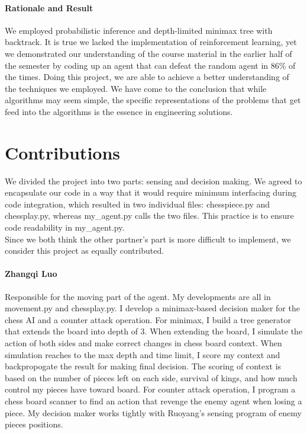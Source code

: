 \documentclass[11pt]{article}
\begin{document}
\paragraph{Rationale and Result}
We employed probabilistic inference and depth-limited minimax tree with backtrack. It is true we lacked the implementation of reinforcement learning, yet we demonstrated our understanding of the course material in the earlier half of the semester by coding up an agent that can defeat the random agent in 86\% of the times.
Doing this project, we are able to achieve a better understanding of the techniques we employed. We have come to the conclusion that while algorithms may seem simple, the specific representations of the problems that get feed into the algorithms is the essence in engineering solutions. 
\section*{Contributions}
We divided the project into two parts: sensing and decision making. We agreed to encapsulate our code in a way that it would require minimum interfacing during code integration, which resulted in two individual files: chesspiece.py and chessplay.py, whereas my\_agent.py calls the two files. This practice is to ensure code readability in my\_agent.py.\vspace{6pt}\\
Since we both think the other partner's part is more difficult to implement,
we consider this project as equally contributed.
\paragraph{Zhangqi Luo} Responsible for the moving part of the agent. My developments are all in movement.py and chessplay.py. I develop a minimax-based decision maker for the chess AI and a counter attack operation. For minimax, I build a tree generator that extends the board into depth of 3. When extending the board, I simulate the action of both sides and make correct changes in chess board context. When simulation reaches to the max depth and time limit, I score my context and backpropogate the result for making final decision. The scoring of context is based on the number of pieces left on each side, survival of kings, and how much control my pieces have toward board. For counter attack operation, I program a chess board scanner to find an action that revenge the enemy agent when losing a piece. My decision maker works tightly with Ruoyang's sensing program of enemy pieces positions.
\end{document}
